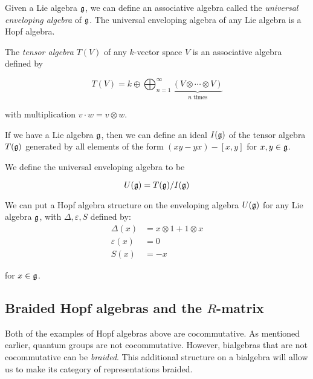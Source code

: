 \begin{example}
    \label{example:UEA}
    Given a Lie algebra $\mathfrak{g}$, we can define an associative algebra
    called the \emph{universal enveloping algebra} of $\mathfrak{g}$. The
    universal enveloping algebra of any Lie algebra is a Hopf algebra.

    The \emph{tensor algebra} $T(V)$ of any $k$-vector space $V$ is an associative
    algebra defined by

    \begin{equation}
        T(V) = k \oplus \bigoplus_{n=1}^\infty \underbrace{(V \otimes \cdots \otimes V)}_{\text{$n$ times}}
    \end{equation}

    with multiplication $v \cdot w = v \otimes w$.


    If we have a Lie algebra $\mathfrak{g}$, then we can define an ideal
    $I(\mathfrak{g})$ of the tensor algebra $T(\mathfrak{g})$ generated by all
    elements of the form $(xy - yx) - \left[ x,y \right]$ for $x,y \in
    \mathfrak{g}$.

    We define the universal enveloping algebra to be 

    \begin{equation}
        U(\mathfrak{g}) = T(\mathfrak{g}) / I(\mathfrak{g})
    \end{equation}

    We can put a Hopf algebra structure on the enveloping algebra
    $U(\mathfrak{g})$ for any Lie algebra $\mathfrak{g}$, with $\Delta,
    \varepsilon, S$ defined by: 
    \begin{align}
        \Delta(x) &= x \otimes 1 + 1 \otimes x \\
        \varepsilon(x) &= 0 \\
        S(x) &= -x  
    \end{align}

    for $x \in \mathfrak{g}$.

\end{example}

\subsection{Braided Hopf algebras and the $R$-matrix}
\label{subsection:R-matrix}

Both of the examples of Hopf algebras above are cocommutative. As mentioned
earlier, quantum groups are not cocommutative. However, bialgebras that are not
cocommutative can be \emph{braided}. This additional structure on a bialgebra
will allow us to make its category of representations braided.

